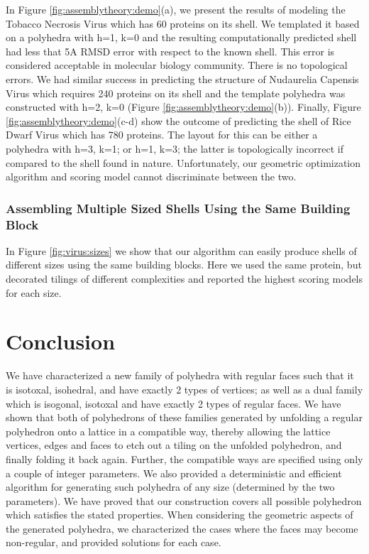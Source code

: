 \documentclass[11pt]{article}
\newcommand{\1}{\mathds{1}}
\begin{document}
In Figure \ref{fig:assemblytheory:demo}(a), we present the results of modeling the Tobacco Necrosis Virus which has 60 proteins on its shell. We templated it based on a polyhedra with h=1, k=0 and the resulting computationally predicted shell had less that 5A RMSD error with respect to the known shell. This error is considered acceptable in molecular biology community. There is no topological errors. We had similar success in predicting the structure of Nudaurelia Capensis Virus which requires 240 proteins on its shell and the template polyhedra was constructed with h=2, k=0 (Figure \ref{fig:assemblytheory:demo}(b)). Finally, Figure \ref{fig:assemblytheory:demo}(c-d) show the outcome of predicting the shell of Rice Dwarf Virus which has 780 proteins. The layout for this can be either a polyhedra with h=3, k=1; or h=1, k=3; the latter is topologically incorrect if compared to the shell found in nature. Unfortunately, our geometric optimization algorithm and scoring model cannot discriminate between the two.


\subsubsection{Assembling Multiple Sized Shells Using the Same Building Block}

In Figure \ref{fig:virus:sizes} we show that our algorithm can easily produce shells of different sizes using the same building blocks. Here we used the same protein, but decorated tilings of different complexities and reported the highest scoring models for each size.



\section{Conclusion}
\label{sec:assemblytheory:conclusion}
We have characterized a new family of polyhedra with regular faces such that it is isotoxal, isohedral, and have exactly 2 types of vertices; as well as a dual family which is isogonal, isotoxal and have exactly 2 types of regular faces. We have shown that both of polyhedrons of these families generated by unfolding a regular polyhedron onto a lattice in a compatible way, thereby allowing the lattice vertices, edges and faces to etch out a tiling on the unfolded polyhedron, and finally folding it back again. Further, the compatible ways are specified using only a couple of integer parameters. We also provided a deterministic and efficient algorithm for generating such polyhedra of any size (determined by the two parameters). We have proved that our construction covers all possible polyhedron which satisfies the stated properties. When considering the geometric aspects of the generated polyhedra, we characterized the cases where the faces may become non-regular, and provided solutions for each case. 
\end{document}
